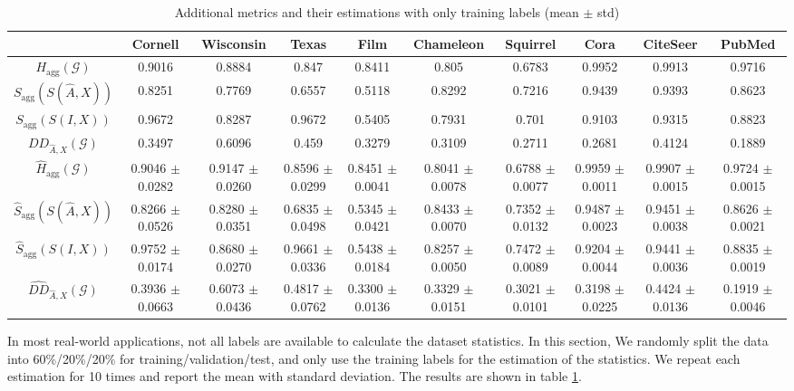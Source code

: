 \documentclass{article}
\newcommand{\0}{{\boldsymbol{0}}}
\newcommand{\6}{{\partial}}
\newcommand{\8}{{\infty}}
\newcommand{\4}{{\nabla}}
\begin{document}
\begin{table}[htbp]
  \centering
  \tiny
  \setlength{\tabcolsep}{2pt}
  \caption{Additional metrics and their estimations with only training labels (mean $\pm$ std)}
    \begin{tabular}{c|ccccccccc}
    \toprule
    \toprule
          & Cornell & Wisconsin & Texas & Film  & Chameleon & Squirrel & Cora  & CiteSeer & PubMed \\
    \midrule
    $H_\text{agg}(\mathcal{G})$ & 0.9016 & 0.8884 & 0.847 & 0.8411 & 0.805 & 0.6783 & 0.9952 & 0.9913 & 0.9716 \\
    $S_\text{agg}\left(S(\hat{A},X)\right)$ & 0.8251 & 0.7769 & 0.6557 & 0.5118 & 0.8292 & 0.7216 & 0.9439 & 0.9393 & 0.8623 \\
     $S_\text{agg}\left(S(I,X)\right)$ & 0.9672 & 0.8287 & 0.9672 & 0.5405 & 0.7931 & 0.701 & 0.9103 & 0.9315 & 0.8823 \\
    $DD_{\hat{A},X}(\mathcal{G})$ & 0.3497 & 0.6096 & 0.459 & 0.3279 & 0.3109 & 0.2711 & 0.2681 & 0.4124 & 0.1889 \\
    \midrule
    $\hat{H}_\text{agg}(\mathcal{G})$ & 0.9046 $\pm$ 0.0282 & 0.9147 $\pm$ 0.0260 & 0.8596 $\pm$ 0.0299 & 0.8451 $\pm$ 0.0041 & 0.8041 $\pm$ 0.0078 & 0.6788 $\pm$ 0.0077 & 0.9959 $\pm$ 0.0011 & 0.9907 $\pm$ 0.0015 & 0.9724 $\pm$ 0.0015 \\
    $\hat{S}_\text{agg}\left(S(\hat{A},X)\right)$ & 0.8266 $\pm$ 0.0526 & 0.8280 $\pm$ 0.0351 & 0.6835 $\pm$ 0.0498 & 0.5345 $\pm$ 0.0421 & 0.8433 $\pm$ 0.0070 & 0.7352 $\pm$ 0.0132 & 0.9487 $\pm$ 0.0023 & 0.9451 $\pm$ 0.0038 & 0.8626 $\pm$ 0.0021 \\
    $\hat{S}_\text{agg}\left(S(I,X)\right)$ & 0.9752 $\pm$ 0.0174 & 0.8680 $\pm$ 0.0270 & 0.9661 $\pm$ 0.0336 & 0.5438 $\pm$ 0.0184 & 0.8257 $\pm$ 0.0050 & 0.7472 $\pm$ 0.0089 & 0.9204 $\pm$ 0.0044 & 0.9441 $\pm$ 0.0036 & 0.8835 $\pm$ 0.0019 \\
    $\hat{DD}_{\hat{A},X}(\mathcal{G})$ & 0.3936 $\pm$ 0.0663 & 0.6073 $\pm$ 0.0436 & 0.4817 $\pm$ 0.0762 & 0.3300 $\pm$ 0.0136 & 0.3329 $\pm$ 0.0151 & 0.3021 $\pm$ 0.0101 & 0.3198 $\pm$ 0.0225 & 0.4424 $\pm$ 0.0136 & 0.1919 $\pm$ 0.0046 \\
    \bottomrule
    \bottomrule
    \end{tabular}\label{tab:estimation_dataset_stats}\end{table} In most real-world applications, not all labels are available to calculate the dataset statistics. In this section, We randomly split the data into 60\%/20\%/20\% for training/validation/test, and only use the training labels for the estimation of the statistics. We repeat each estimation for 10 times and report the mean with standard deviation. The results are shown in table \ref{tab:estimation_dataset_stats}.
\end{document}
